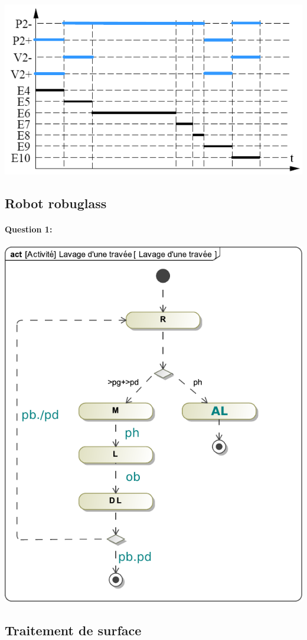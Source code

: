 \begin{center}
 \includegraphics[width=0.7\linewidth]{img/chronogramme_cor}
\end{center}

\subsection{Robot robuglass}

\paragraph{Question 1:}

\begin{center}
 \includegraphics[width=0.7\linewidth]{img/Lavage_travee_cor}
\end{center}

\subsection{Traitement de surface}

